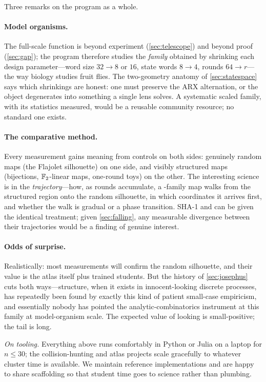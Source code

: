 \medskip

Three remarks on the program as a whole.

\paragraph{Model organisms.} The full-scale function is beyond experiment
(\cref{sec:telescope}) and beyond proof (\cref{sec:gap}); the program
therefore studies the \emph{family} obtained by shrinking each design
parameter---word size $32 \to 8$ or $16$, state words $8 \to 4$, rounds
$64 \to r$---the way biology studies fruit flies. The two-geometry anatomy
of \cref{sec:statespace} says which shrinkings are honest: one must
preserve the ARX alternation, or the object degenerates into something a
single lens solves. A systematic scaled family, with its statistics
measured, would be a reusable community resource; no standard one exists.

\paragraph{The comparative method.} Every measurement gains meaning from
controls on both sides: genuinely random maps (the Flajolet silhouette)
on one side, and visibly structured maps (bijections, $\mathbb{F}_2$-linear
maps, one-round toys) on the other. The interesting science is in the
\emph{trajectory}---how, as rounds accumulate, a \SHA{}-family map walks
from the structured region onto the random silhouette, in which
coordinates it arrives first, and whether the walk is gradual or a phase
transition. SHA-1 and \SHA{} can be given the identical treatment; given
\cref{sec:falling}, any measurable divergence between their trajectories
would be a finding of genuine interest.

\paragraph{Odds of surprise.} Realistically: most measurements will
confirm the random silhouette, and their value is the atlas itself plus
trained students. But the history of \cref{sec:josephus} cuts both
ways---structure, when it exists in innocent-looking discrete processes,
has repeatedly been found by exactly this kind of patient small-case
empiricism, and essentially nobody has pointed the analytic-combinatorics
instrument at this family at model-organism scale. The expected value of
looking is small-positive; the tail is long.

\medskip

\noindent\emph{On tooling.} Everything above runs comfortably in Python
or Julia on a laptop for $n \le 30$; the collision-hunting and atlas
projects scale gracefully to whatever cluster time is available. We
maintain reference implementations and are happy to share scaffolding so
that student time goes to science rather than plumbing.
